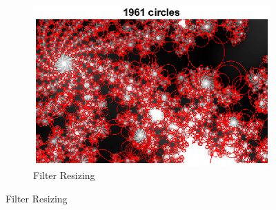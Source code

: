 \documentclass{article}
\newcommand{\tl}[1]{\textlatin{#1}}
\begin{document}
\begin{figure}[H]
\begin{subfigure}[b]{0.37\textwidth}
			\includegraphics[width=\textwidth]{res/snowflakes_blob.eps}	
			\caption{\tl{Filter Resizing}}	
		\end{subfigure}%
	\end{figure}
	
\end{document}

